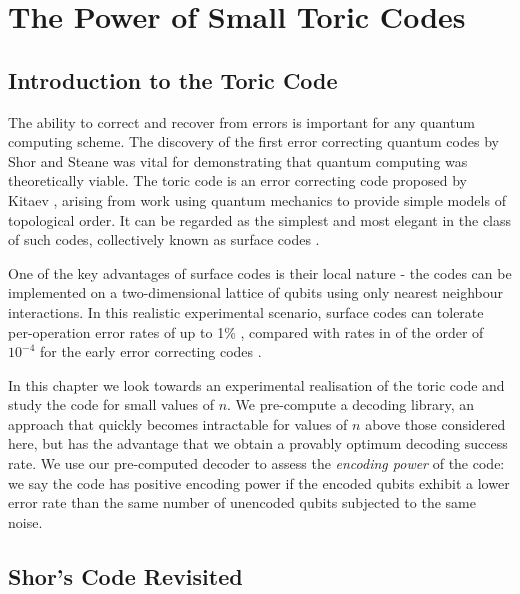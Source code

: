\chapter{The Power of Small Toric Codes} 
\label{ch:SurfaceCodes}

\section{Introduction to the Toric Code}

The ability to correct and recover from errors is important for any quantum computing scheme. The discovery of the first error correcting quantum codes by Shor and Steane \cite{shor_codes_95, steane_code_96, steane_code_96_2} was vital for demonstrating that quantum computing was theoretically viable. The toric code is an error correcting code proposed by Kitaev \cite{kitaev_1, kitaev_2}, arising from work using quantum mechanics to provide simple models of topological order. It can be regarded as the simplest and most elegant in the class of such codes, collectively known as surface codes \cite{kitaev_bravyi, planar_codes_freedman_meyer}.

One of the key advantages of surface codes is their local nature - the codes can be implemented on a two-dimensional lattice of qubits using only nearest neighbour interactions. In this realistic experimental scenario, surface codes can tolerate per-operation error rates of up to 1\% \cite{fowler11, fowler_classical_processing}, compared with rates in of the order of $10^{-4}$ for the early error correcting codes \cite{steane_code_shit}.

In this chapter we look towards an experimental realisation of the toric code and study the code for small values of $n$. We pre-compute a decoding library, an approach that quickly becomes intractable for values of $n$ above those considered here, but has the advantage that we obtain a provably optimum decoding success rate. We use our pre-computed decoder to assess the \textit{encoding power} of the code: we say the code has positive encoding power if the encoded qubits exhibit a lower error rate than the same number of unencoded qubits subjected to the same noise.

\section{Shor's Code Revisited}

